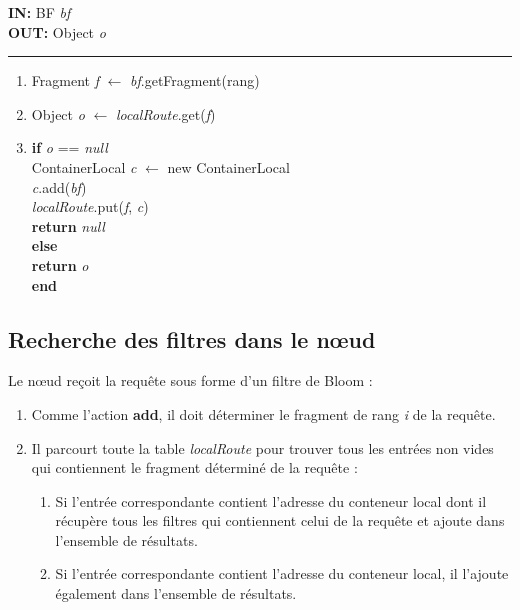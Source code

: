 \documentclass[a4paper,11pt]{report}
\begin{document}
\begin{flushleft}
	\begin{framed}
		\textbf{IN:} BF \textit{bf}\\
		\textbf{OUT:} Object \textit{o}\\
		\noindent\rule{\linewidth}{0.5pt}

		\begin{enumerate}
			\item Fragment \textit{f} $\leftarrow$ \textit{bf}.getFragment(rang)
			\item Object \textit{o} $\leftarrow$ \textit{localRoute}.get(\textit{f})
			\item 
				\begin{tabbing}
					\textbf{if }\= \textit{o} == \textit{null}\\
						\> ContainerLocal \textit{c} $\leftarrow$ new ContainerLocal\\
						\> \textit{c}.add(\textit{bf})\\
						\> \textit{localRoute}.put(\textit{f}, \textit{c})\\
						\> \textbf{return} \textit{null}\\
					\textbf{else}\\
						\> \textbf{return} \textit{o}\\
					\textbf{end} 
				\end{tabbing}
		\end{enumerate}	
	\end{framed}
\end{flushleft}


\subsection{Recherche des filtres dans le nœud}
	Le nœud reçoit la requête sous forme d'un filtre de Bloom : 
	\begin{enumerate}
		\item Comme l'action \textbf{add}, il doit déterminer le fragment de rang \textit{i} de la requête.
		\item Il parcourt toute la table \textit{localRoute} pour trouver tous les entrées non vides qui contiennent le fragment déterminé de la requête :
			\begin{enumerate}
			\item Si l'entrée correspondante contient l'adresse du conteneur local dont il récupère tous les filtres qui contiennent celui de la requête et ajoute dans l'ensemble de résultats.
			\item Si l'entrée correspondante contient l'adresse du conteneur local, il l'ajoute également dans l'ensemble de résultats.
			\end{enumerate}
	\end{enumerate}		
	
\end{document}

